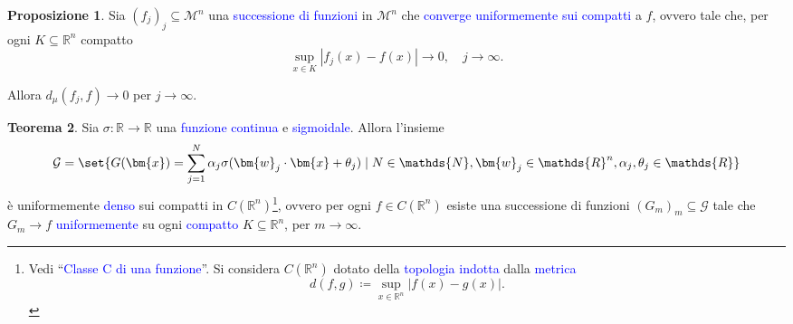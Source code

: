 \documentclass[10pt]{book}
\newcommand{\1}{\mathds{1}}
\newcommand{\R}{\mathds{R}}
\newcommand{\N}{\mathds{N}}
\theoremstyle{definition}%
\newtheorem{thm}{Teorema}[section]
\newtheorem{prop}[thm]{Proposizione}
\theoremstyle{plain}
\theoremstyle{remark}
\renewcommand{\href}[2]{\textcolor{blue}{#2}}
\begin{document}
\begin{prop}
Sia \((f_{j})_{j} \subseteq \mathcal{M}^{n}\) una \href{../../../../../org/roam/20250629105815-successione_di_funzioni.org}{successione di funzioni} in \(\mathcal{M}^{n}\) che \href{../../../../../org/roam/20250706121659-convergenza_uniforme_sui_compatti.org}{converge uniformemente sui compatti} a \(f\), ovvero tale che, per ogni \(K \subseteq \R^{n}\) compatto
\begin{equation*}
\sup_{x \in K} |f_{j}(x)-f(x)|\to 0,\quad j\to\infty.
\end{equation*}

Allora \(d_{\mu}(f_{j},f)\to 0\) per \(j\to \infty\).
\label{prop9.3.21}
\end{prop}
\begin{thm}
Sia \(\sigma:\R\to\R\) una \href{../../../../../org/roam/20250202170607-classe_relazione_binaria.org}{funzione} \href{../../../../../org/roam/20250103103252-funzione_continua.org}{continua} e \href{../../../../../org/roam/20250625110110-funzione_sigmoidale.org}{sigmoidale}. Allora l'insieme
\begin{equation*}
\mathcal{G} =\set{
G(\bm{x}) = \sum_{j=1}^{N}\alpha_{j}\sigma(\bm{w}_{j}\cdot \bm{x} + \theta_{j})\mid N \in \N, \bm{w}_{j} \in \R^{n}, \alpha_{j},\theta_{j} \in \R
}
\end{equation*}
è uniformemente \href{../../../../../org/roam/20250301193045-sottoinsieme_denso.org}{denso} sui compatti in \(C(\R^{n})\)\footnote{Vedi ``\href{../../../../../org/roam/20250113125602-classe_c_di_una_funzione.org}{Classe C di una funzione}''. Si considera \(C(\R^{n})\) dotato della \href{../../../../../org/roam/20250103145124-topologia.org}{topologia} \href{../../../../../org/roam/20250301193530-topologia_indotta_da_una_distanza.org}{indotta} dalla \href{../../../../../org/roam/20250301193511-spazio_metrico.org}{metrica}
\begin{equation*}
d(f,g) \coloneqq \sup_{x \in \R^{n}} |f(x)-g(x)|.
\end{equation*}}, ovvero per ogni \(f \in C(\R^{n})\) esiste una successione di funzioni \((G_{m})_{m} \subseteq \mathcal{G}\) tale che \(G_{m}\to f\) \href{../../../../../org/roam/20250706121659-convergenza_uniforme_sui_compatti.org}{uniformemente} su ogni \href{../../../../../org/roam/20250103163701-spazio_topologico_compatto.org}{compatto} \(K \subseteq \R^{n}\), per \(m\to\infty\).
\label{thm9.3.22}
\end{thm}
\end{document}
